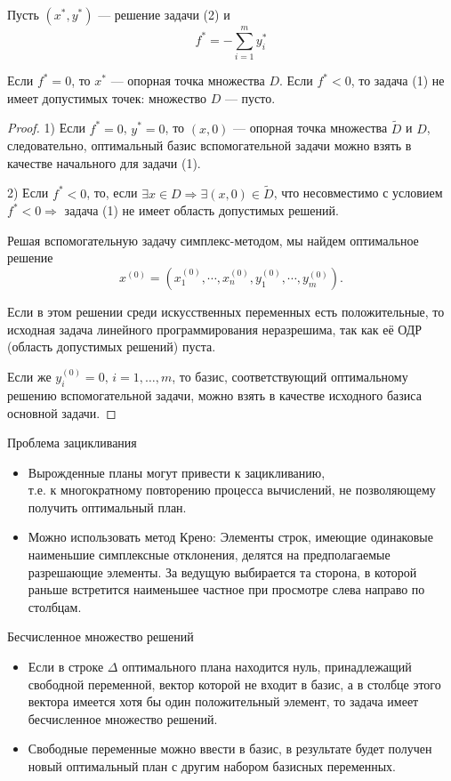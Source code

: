 \documentclass[17pt]{extarticle}
\begin{document}
\begin{proposition}
    Пусть \( (x^*, y^*) \) — решение задачи (2) и
    \[
        f^* = -\sum_{i=1}^m y_i^*
    \]

    Если \( f^* = 0 \), то \( x^* \) — опорная точка множества \( D \).
    Если \( f^* < 0 \), то задача (1) не имеет допустимых точек: множество \( D \) — пусто.
\end{proposition}
\begin{proof}
    1) Если \( f^* = 0 \), \( y^* = 0 \), то \( (x, 0) \) — опорная точка множества \( \tilde{D} \) и \( D \), следовательно,
    оптимальный базис вспомогательной задачи можно взять в качестве начального для задачи (1).

    2) Если \( f^* < 0 \), то, если \( \exists x \in D \Rightarrow \exists(x, 0) \in \tilde{D} \),
    что несовместимо с условием \( f^* < 0 \Rightarrow \) задача (1) не имеет область допустимых решений.

    Решая вспомогательную задачу симплекс-методом, мы найдем оптимальное решение
    \[
        x^{(0)} = (x_1^{(0)}, \cdots, x_n^{(0)}, y_1^{(0)}, \cdots, y_m^{(0)}).
    \]

    Если в этом решении среди искусственных переменных есть положительные,
    то исходная задача линейного программирования неразрешима, так как её ОДР (область допустимых решений) пуста.

    Если же \( y_i^{(0)} = 0, \, i = 1, \ldots, m \), то базис,
    соответствующий оптимальному решению вспомогательной задачи, можно взять в качестве исходного базиса основной задачи.
\end{proof}

\begin{remark}
    Проблема зацикливания
    \begin{itemize}
        \item Вырожденные планы могут привести к зацикливанию, \\
              т.е. к многократному повторению процесса вычислений, не позволяющему получить оптимальный план.
        \item Можно использовать метод Крено: Элементы строк, имеющие одинаковые наименьшие симплексные отклонения, делятся на предполагаемые разрешающие элементы. За ведущую выбирается та сторона, в которой раньше встретится наименьшее частное при просмотре слева направо по столбцам.
    \end{itemize}

    Бесчисленное множество решений
    \begin{itemize}
        \item Если в строке \(\Delta\) оптимального плана находится нуль, принадлежащий свободной переменной, вектор которой не входит в базис, а в столбце этого вектора имеется хотя бы один положительный элемент, то задача имеет бесчисленное множество решений.
        \item Свободные переменные можно ввести в базис, в результате будет получен новый оптимальный план с другим набором базисных переменных.
    \end{itemize}
\end{remark}
\end{document}
